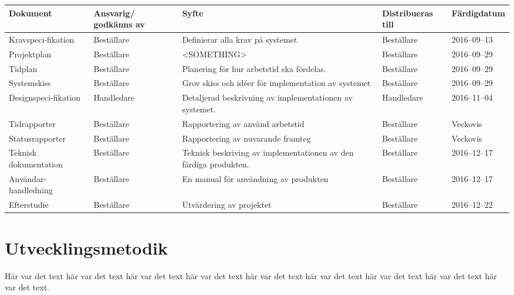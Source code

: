 \documentclass[a4paper,titlepage,12pt]{article}
\begin{document}
	\begin{longtable}[l]{ p{2.5cm} p{2.1cm} >{\raggedright}p{4cm} p{2.2cm} l }
        \textbf{Dokument} & \textbf{Ansvarig/ godkänns av} & \textbf{Syfte} & \textbf{Distribueras till} & \textbf{Färdigdatum} \\ \midrule
        
        Kravspeci-fikation & Beställare & Definierar alla krav på
        systemet & Beställare & 2016--09--13 \\ \midrule

        Projektplan & Beställare & <SOMETHING> & Beställare &
        2016--09--29 \\ \midrule

        Tidplan & Beställare & Planering för hur arbetstid ska
        fördelas. & Beställare & 2016--09--29  \\ \midrule
        
        Systemskiss & Beställare & Grov skiss och idéer för 
        implementation av systemet & Beställare & 2016--09--29 \\ \midrule

        Designspeci-fikation & Handledare & Detaljerad beskrivning av
        implementationen av systemet. & Handledare & 2016--11--04 \\ \midrule

        Tidrapporter & Beställare & Rapportering av använd arbetstid &
        Beställare & Veckovis        \\ \midrule

        Statusrapporter & Beställare & Rapportering av nuvarande framteg &
        Beställare & Veckovis \\ \midrule

        Teknisk dokumentation & Beställare & Teknisk beskriving av
        implementationen av den färdiga produkten. & Beställare &
        2016--12--17 \\ \midrule

        Användar- handledning & Beställare & En manual för användning av
        produkten & Beställare & 2016--12--17 \\ \midrule

        Efterstudie & Beställare & Utvärdering av projektet &
        Beställare & 2016--12--22  \\ \midrule
    \end{longtable}
	
	
	\section{Utvecklingsmetodik}
	Här var det text här var det text här var det text
	här var det text här var det text här var det text
	här var det text här var det text här var det text.
	
\end{document}
